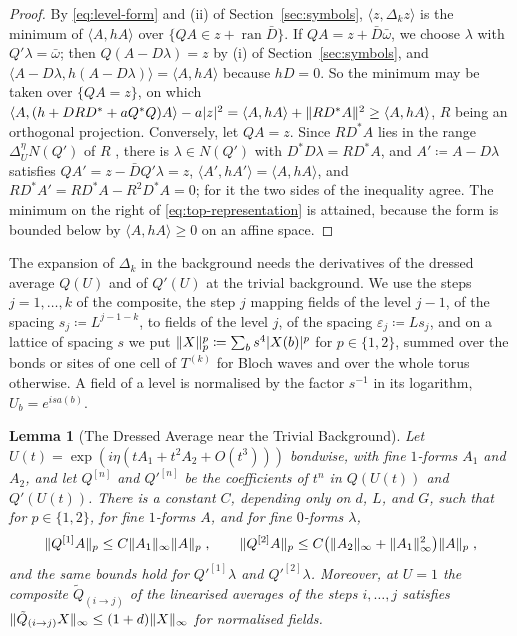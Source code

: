 \documentclass[11pt]{preprint}
\DeclarePairedDelimiter{\abs}{\lvert}{\rvert}
\DeclarePairedDelimiter{\norm}{\lVert}{\rVert}
\numberwithin{equation}{section}
\newtheorem{lemma}{Lemma}[section]
\theoremstyle{definition}
\theoremstyle{remark}
\theoremstyle{plain}
\begin{document}
\begin{proof}
By \eqref{eq:level-form} and (ii) of Section~\ref{sec:symbols}, $\langle z, \Delta_kz \rangle$ is the minimum of $\langle A, hA \rangle$ over $\{ QA \in z + \operatorname{ran}\bar D \}$. If $QA = z + \bar D\bar\omega$, we choose $\lambda$ with $Q'\lambda = \bar\omega$; then $Q(A - D\lambda) = z$ by (i) of Section~\ref{sec:symbols}, and $\langle A - D\lambda, h(A - D\lambda) \rangle = \langle A, hA \rangle$ because $hD = 0$. So the minimum may be taken over $\{ QA = z \}$, on which $\langle A, (h + DRD^* + aQ^*Q)A \rangle - a\abs{z}^2 = \langle A, hA \rangle + \norm{RD^*A}^2 \geq \langle A, hA \rangle$, $R$ being an orthogonal projection. Conversely, let $QA = z$. Since $RD^*A$ lies in the range $\Delta^\eta_UN(Q')$ of $R$ \cite[(3.21), p.~394]{BalabanPBG}, there is $\lambda \in N(Q')$ with $D^*D\lambda = RD^*A$, and $A' \coloneqq A - D\lambda$ satisfies $QA' = z - \bar DQ'\lambda = z$, $\langle A', hA' \rangle = \langle A, hA \rangle$, and $RD^*A' = RD^*A - R^2D^*A = 0$; for it the two sides of the inequality agree. The minimum on the right of \eqref{eq:top-representation} is attained, because the form is bounded below by $\langle A, hA \rangle \geq 0$ on an affine space.
\end{proof}

The expansion of $\Delta_k$ in the background needs the derivatives of the dressed average $Q(U)$ and of $Q'(U)$ at the trivial background. We use the steps $j = 1, \dots, k$ of the composite, the step $j$ mapping fields of the level $j - 1$, of the spacing $s_j \coloneqq L^{j-1-k}$, to fields of the level $j$, of the spacing $\varepsilon_j \coloneqq Ls_j$, and on a lattice of spacing $s$ we put $\norm{X}_p^p \coloneqq \sum_bs^4\abs{X(b)}^p$ for $p \in \{ 1, 2 \}$, summed over the bonds or sites of one cell of $T^{(k)}$ for Bloch waves and over the whole torus otherwise. A field of a level is normalised by the factor $s^{-1}$ in its logarithm, $U_b = e^{isa(b)}$.

\begin{lemma}[The Dressed Average near the Trivial Background]\label{lem:dressed-average}
Let $U(t) = \exp(i\eta(tA_1 + t^2A_2 + O(t^3)))$ bondwise, with fine $1$-forms $A_1$ and $A_2$, and let $Q^{[n]}$ and $Q'^{[n]}$ be the coefficients of $t^n$ in $Q(U(t))$ and $Q'(U(t))$. There is a constant $C$, depending only on $d$, $L$, and $G$, such that for $p \in \{ 1, 2 \}$, for fine $1$-forms $A$, and for fine $0$-forms $\lambda$,
\begin{equation}\label{eq:dressed-average}
    \norm{Q^{[1]}A}_p \leq C\norm{A_1}_\infty\norm{A}_p\;,
    \qquad
    \norm{Q^{[2]}A}_p \leq C\bigl(\norm{A_2}_\infty + \norm{A_1}_\infty^2\bigr)\norm{A}_p\;,
\end{equation}
and the same bounds hold for $Q'^{[1]}\lambda$ and $Q'^{[2]}\lambda$. Moreover, at $U = 1$ the composite $\tilde Q_{(i \to j)}$ of the linearised averages \cite[(0.4)]{BalabanRG1} of the steps $i, \dots, j$ satisfies $\norm{\tilde Q_{(i \to j)}X}_\infty \leq (1 + d)\norm{X}_\infty$ for normalised fields.
\end{lemma}
\end{document}
